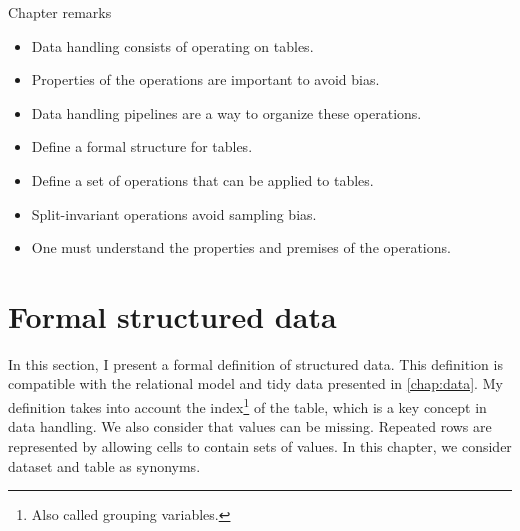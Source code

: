 \begin{mainbox}{Chapter remarks}


  \startcontents[chapters]
  \vspace{1em}


  \begin{itemize}
    \itemsep0em
    \item Data handling consists of operating on tables.
    \item Properties of the operations are important to avoid bias.
    \item Data handling pipelines are a way to organize these operations.
  \end{itemize}


  \begin{itemize}
    \itemsep0em
    \item Define a formal structure for tables.
    \item Define a set of operations that can be applied to tables.
  \end{itemize}


  \begin{itemize}
    \itemsep0em
    \item Split-invariant operations avoid sampling bias.
    \item One must understand the properties and premises of the operations.
  \end{itemize}
\end{mainbox}

{}
\clearpage

\section{Formal structured data}
\label{sec:formal-structured-data}

\newcommand{\domainof}[1]{\mathcal{D}\!\left(#1\right)}
\newcommand{\missing}{\text{?}}
\newcommand{\rowcard}[1][k_1, \dots, k_k]{\operatorname{card}\!\left(#1\right)}

In this section, I present a formal definition of structured data.  This definition is
compatible with the relational model and tidy data presented in \cref{chap:data}.
My definition takes into account the index\footnote{Also called grouping variables.} of
the table, which is a key concept in data handling.  We also consider that values can be
missing.  Repeated rows are represented by allowing cells to contain sets of values.
In this chapter, we consider dataset and table as synonyms.

